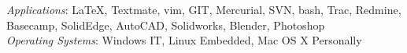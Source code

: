 \documentclass[10pt]{article}
\newenvironment{innerlist}[1][\enskip\textbullet]%
        {\begin{compactitem}[#1]}{\end{compactitem}}
\newcommand{\blankline}{\quad\pagebreak[2]}
\begin{document}

\textit{Applications}: \LaTeX{}, Textmate, vim, GIT, Mercurial, SVN, bash, Trac, Redmine, Basecamp, SolidEdge, AutoCAD, Solidworks, Blender, Photoshop \\


\textit{Operating Systems}: Windows IT, Linux Embedded, Mac OS X Personally
\end{document}
